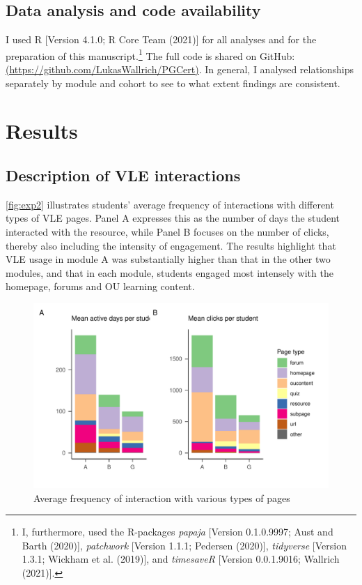 \documentclass[
  english,
  man,mask,floatsintext]{apa6}
\begin{document}
\hypertarget{data-analysis-and-code-availability}{%
\subsection{Data analysis and code availability}\label{data-analysis-and-code-availability}}

I used R {[}Version 4.1.0; R Core Team (2021){]} for all analyses and for the preparation of this manuscript.\footnote{I, furthermore, used the R-packages \emph{papaja} {[}Version 0.1.0.9997; Aust and Barth (2020){]}, \emph{patchwork} {[}Version 1.1.1; Pedersen (2020){]}, \emph{tidyverse} {[}Version 1.3.1; Wickham et al. (2019){]}, and \emph{timesaveR} {[}Version 0.0.1.9016; Wallrich (2021){]}.} The full code is shared on GitHub: \href{https://github.com/LukasWallrich/PGCert}{(https://github.com/LukasWallrich/PGCert)}. In general, I analysed relationships separately by module and cohort to see to what extent findings are consistent.

\hypertarget{results}{%
\section{Results}\label{results}}

\hypertarget{description-of-vle-interactions}{%
\subsection{Description of VLE interactions}\label{description-of-vle-interactions}}

\autoref{fig:exp2} illustrates students' average frequency of interactions with different types of VLE pages. Panel A expresses this as the number of days the student interacted with the resource, while Panel B focuses on the number of clicks, thereby also including the intensity of engagement. The results highlight that VLE usage in module A was substantially higher than that in the other two modules, and that in each module, students engaged most intensely with the homepage, forums and OU learning content.

\begin{figure}
\centering
\includegraphics{Assigment-2---OU-data_files/figure-latex/unnamed-chunk-3-1.pdf}
\caption{\label{fig:unnamed-chunk-3}Average frequency of interaction with various types of pages \label{fig:exp2}}
\end{figure}
\end{document}
